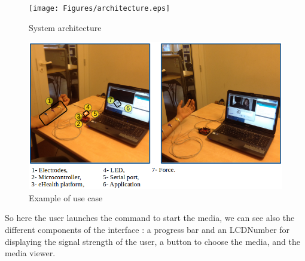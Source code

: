 \documentclass[conference]{IEEEtran}
\begin{document}
\begin{figure}[!hb]
    \texttt{[image: Figures/architecture.eps]}
    \caption{System architecture}
    \label{fig:architecture}
\end{figure}
 
\begin{figure}[!hb]
    \includegraphics[scale=0.30]{Figures/app2.png}
    \caption{Example of use case}
    \label{fig:example}
\end{figure}
So here the user launches the command to start the media, 
we can see also the different components of the interface : a progress bar and an LCDNumber for displaying the signal strength of the user, 
a button to choose the media, and the media viewer.\par
\end{document}
